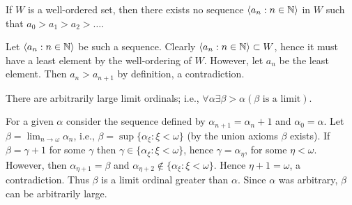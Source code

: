 \begin{problem}
  If $W$ is a well-ordered set, then there exists no sequence $\langle a_n : n \in \mathbb{N} \rangle$ in $W$ such that $a_0 > a_1 > a_2 > \ldots$.
\end{problem}

\begin{solution}
  Let $\langle a_n : n \in \mathbb{N} \rangle$ be such a sequence.
  Clearly $\langle a_n : n \in \mathbb{N} \rangle \subset W$, hence it must have a least element by the well-ordering of $W$.
  However, let $a_n$ be the least element.
  Then $a_n > a_{n + 1}$ by definition, a contradiction.
\end{solution}

\begin{problem}
  There are arbitrarily large limit ordinals; i.e., $\forall \alpha \exists \beta > \alpha (\beta \text{ is a limit})$.
\end{problem}

\begin{solution}
  For a given $\alpha$ consider the sequence defined by $\alpha_{n + 1} = \alpha_n + 1$ and $\alpha_0 = \alpha$.
  Let $\beta = \lim_{n \to \omega} \alpha_n$, i.e., $\beta = \sup \{\alpha_{\xi} : \xi < \omega\}$ (by the union axioms $\beta$ exists).
  If $\beta = \gamma + 1$ for some $\gamma$ then $\gamma \in \{\alpha_{\xi} : \xi < \omega\}$, hence $\gamma = \alpha_{\eta}$, for some $\eta < \omega$.
  However, then $\alpha_{\eta + 1} = \beta$ and $\alpha_{\eta + 2} \notin \{\alpha_{\xi} : \xi < \omega\}$.
  Hence $\eta + 1 = \omega$, a contradiction.
  Thus $\beta$ is a limit ordinal greater than $\alpha$.
  Since $\alpha$ was arbitrary, $\beta$ can be arbitrarily large.
\end{solution}

